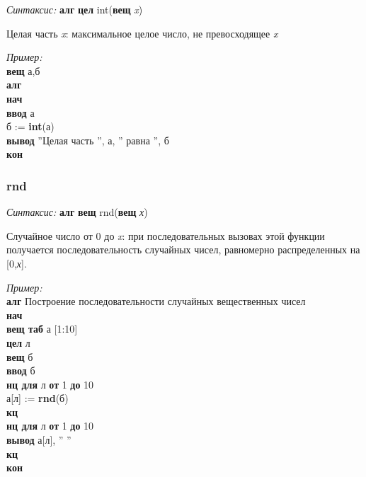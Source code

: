 \emph{Синтаксис:} \textbf{алг} \textbf{цел} int(\textbf{вещ} \emph{x})


     
 
		 Целая часть \emph{x}: максимальное целое число, не превосходящее \emph{x}
      
\emph{Пример:}  
\sffamily
~\\\textbf{вещ} а,б
~\\\textbf{алг
~\\нач
~\\\otstup ввод} а
~\\\otstup б := \textbf{int}(а)
~\\\otstup \textbf{вывод} ''Целая часть '', а, '' равна '', б
~\\\textbf{кон }









 
\normalfont
\subsubsection{rnd}

\emph{Синтаксис:} \textbf{алг} \textbf{вещ} rnd(\textbf{вещ} \emph{х})


     
 
	Случайное число от 0 до \emph{x}: при последовательных вызовах этой функции получается 
последовательность  случайных чисел, равномерно распределенных на [0,\emph{х}].
      
\emph{Пример:}  
\sffamily
~\\\textbf{алг} Построение последовательности случайных вещественных чисел
~\\\textbf{нач
~\\\otstup вещ таб} а [1:10]
~\\\otstup \textbf{цел} л
~\\\otstup \textbf{вещ} б
~\\\otstup \textbf{ввод} б
~\\\otstup \textbf{нц для} л \textbf{от} 1 \textbf{до} 10 
~\\\otstup \otstup а[л] := \textbf{rnd}(б)
~\\\otstup \textbf{кц}
~\\\otstup \textbf{нц для} л \textbf{от} 1 \textbf{до} 10 
~\\\otstup \otstup \textbf{вывод} а[л], '' ''
~\\\otstup \textbf{кц
~\\кон}


